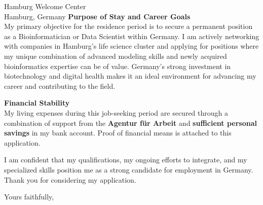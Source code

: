 \documentclass[fontsize=12pt,paper=a4,parskip=half]{scrlttr2}
\begin{document}
\begin{letter}{Hamburg Welcome Center\\Hamburg, Germany}
\textbf{Purpose of Stay and Career Goals}\\
My primary objective for the residence period is to secure a permanent position as a Bioinformatician or Data Scientist within Germany. I am actively networking with companies in Hamburg's life science cluster and applying for positions where my unique combination of advanced modeling skills and newly acquired bioinformatics expertise can be of value. Germany's strong investment in biotechnology and digital health makes it an ideal environment for advancing my career and contributing to the field.

\textbf{Financial Stability}\\
My living expenses during this job-seeking period are secured through a combination of support from the \textbf{Agentur für Arbeit} and \textbf{sufficient personal savings} in my bank account. Proof of financial means is attached to this application.

I am confident that my qualifications, my ongoing efforts to integrate, and my specialized skills position me as a strong candidate for employment in Germany. Thank you for considering my application.

\closing{Yours faithfully,}

\end{letter}
\end{document}
